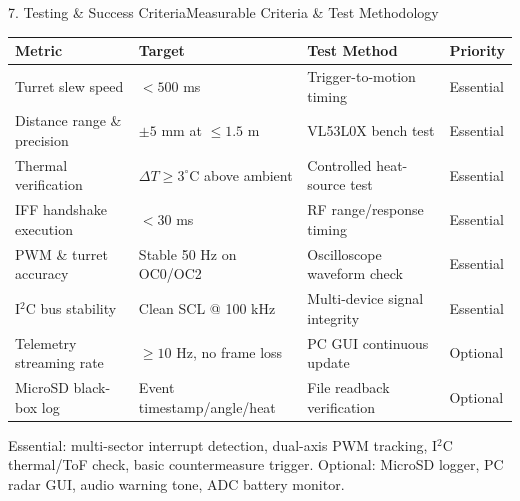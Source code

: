 \documentclass[aspectratio=169, 10pt]{beamer}
\begin{document}
\begin{frame}{7. Testing \& Success Criteria}{Measurable Criteria \& Test Methodology}
    \scriptsize
    \begin{table}
        \centering
        \begin{tabular}{llll}
            \toprule
            \textbf{\color{Accent} Metric} & \textbf{\color{Accent} Target} & \textbf{\color{Accent} Test Method} & \textbf{\color{Accent} Priority} \\
            \midrule
            Turret slew speed & $< 500$ ms & Trigger-to-motion timing & Essential \\
            Distance range \& precision & $\pm 5$ mm at $\le 1.5$ m & VL53L0X bench test & Essential \\
            Thermal verification & $\Delta T \ge 3^\circ$C above ambient & Controlled heat-source test & Essential \\
            IFF handshake execution & $< 30$ ms & RF range/response timing & Essential \\
            PWM \& turret accuracy & Stable 50 Hz on OC0/OC2 & Oscilloscope waveform check & Essential \\
            I$^2$C bus stability & Clean SCL @ 100 kHz & Multi-device signal integrity & Essential \\
            Telemetry streaming rate & $\ge 10$ Hz, no frame loss & PC GUI continuous update & Optional \\
            MicroSD black-box log & Event timestamp/angle/heat & File readback verification & Optional \\
            \bottomrule
        \end{tabular}
    \end{table}
    \vspace{0.2cm}
    \footnotesize\color{Dim} Essential: multi-sector interrupt detection, dual-axis PWM tracking, I$^2$C thermal/ToF check, basic countermeasure trigger. Optional: MicroSD logger, PC radar GUI, audio warning tone, ADC battery monitor.
\end{frame}
\end{document}
